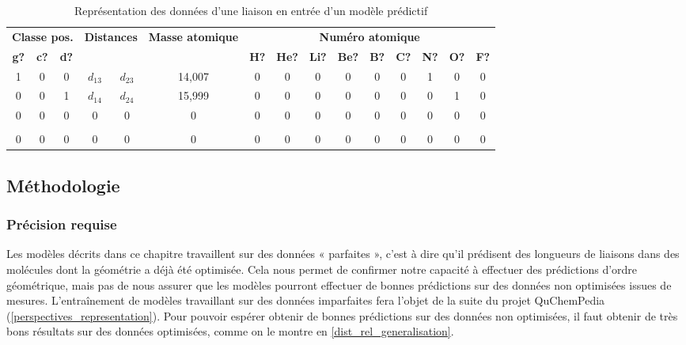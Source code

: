\begin{table}
	\centering


	\begin{tabular}{|c|c|c|c|c|c|c|c|c|c|c|c|c|c|c|}
		\hline
		\multicolumn{3}{|c|}{\textbf{Classe pos.}} & \multicolumn{2}{|c|}{\textbf{Distances}} & \textbf{Masse atomique} & \multicolumn{9}{|c|}{\textbf{Numéro atomique}} \\
		\textbf{g?} & \textbf{c?} & \textbf{d?} & \multicolumn{2}{|c|}{}& & \textbf{H?} & \textbf{He?} & \textbf{Li?} & \textbf{Be?} & \textbf{B? }& \textbf{C?} & \textbf{N?} & \textbf{O?} & \textbf{F?} \\ \hline
		1 & 0 & 0 & $d_{13}$ & $d_{23}$ & 14,007 & 0 & 0 & 0 & 0 & 0 & 0 & 1 & 0 & 0 \\ \hline
		0 & 0 & 1 & $d_{14}$ & $d_{24}$ & 15,999 & 0 & 0 & 0 & 0 & 0 & 0 & 0 & 1 & 0 \\ \hline
		0 & 0 & 0 & 0 & 0 & 0 & 0 & 0 & 0 & 0 & 0 & 0 & 0 & 0 & 0 \\ \hline
		\rot{... } & \rot{... } & \rot{... } & \rot{... } & \rot{... } & \rot{... } & \rot{... } & \rot{... } & \rot{... } & \rot{... } & \rot{... } & \rot{... } & \rot{... } & \rot{... } & \rot{... }  \\ \hline 
		0 & 0 & 0 & 0 & 0 & 0 & 0 & 0 & 0 & 0 & 0 & 0 & 0 & 0 & 0 \\ \hline
	\end{tabular}

	\caption{Représentation des données d'une liaison en entrée d'un modèle prédictif}
	\label{tableau_repr_entree_modeles}
\end{table}



\subsection{Méthodologie}

\subsubsection{Précision requise}
\label{dist_rel_precision_requise}

\par Les modèles décrits dans ce chapitre travaillent sur des données « parfaites », c'est à dire qu'il prédisent des longueurs de liaisons dans des molécules dont la géométrie a déjà été optimisée. Cela nous permet de confirmer notre capacité à effectuer des prédictions d'ordre géométrique, mais pas de nous assurer que les modèles pourront effectuer de bonnes prédictions sur des données non optimisées issues de mesures. L'entraînement de modèles travaillant sur des données imparfaites fera l'objet de la suite du projet QuChemPedia (\ref{perspectives_representation}). Pour pouvoir espérer obtenir de bonnes prédictions sur des données non optimisées, il faut obtenir de très bons résultats sur des données optimisées, comme on le montre en \ref{dist_rel_generalisation}.

